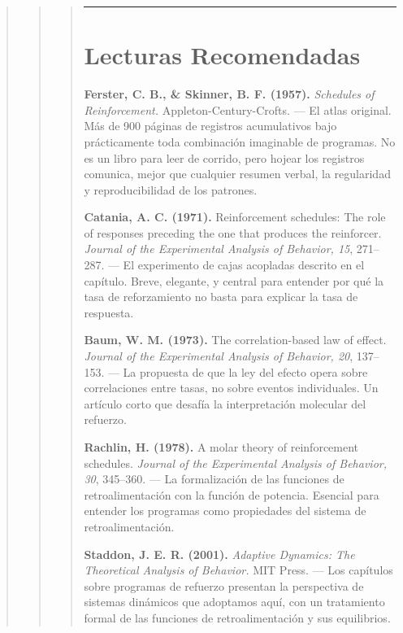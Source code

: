 \documentclass[
  letterpaper,
  DIV=11,
  numbers=noendperiod]{scrreprt}
\begin{document}
\begin{tcolorbox}[enhanced jigsaw, arc=.35mm, bottomrule=.15mm, breakable, colback=white, colframe=quarto-callout-note-color-frame, left=2mm, leftrule=.75mm, opacityback=0, rightrule=.15mm, toprule=.15mm]
\begin{quote}
\begin{quote}
\begin{quote}
\begin{center}\rule{0.5\linewidth}{0.5pt}\end{center}

\mbox{}%
\section{Lecturas Recomendadas}\label{lecturas-recomendadas-5}

\textbf{Ferster, C. B., \& Skinner, B. F. (1957).} \emph{Schedules of
Reinforcement.} Appleton-Century-Crofts. --- El atlas original. Más de
900 páginas de registros acumulativos bajo prácticamente toda
combinación imaginable de programas. No es un libro para leer de
corrido, pero hojear los registros comunica, mejor que cualquier resumen
verbal, la regularidad y reproducibilidad de los patrones.

\textbf{Catania, A. C. (1971).} Reinforcement schedules: The role of
responses preceding the one that produces the reinforcer. \emph{Journal
of the Experimental Analysis of Behavior, 15}, 271--287. --- El
experimento de cajas acopladas descrito en el capítulo. Breve, elegante,
y central para entender por qué la tasa de reforzamiento no basta para
explicar la tasa de respuesta.

\textbf{Baum, W. M. (1973).} The correlation-based law of effect.
\emph{Journal of the Experimental Analysis of Behavior, 20}, 137--153.
--- La propuesta de que la ley del efecto opera sobre correlaciones
entre tasas, no sobre eventos individuales. Un artículo corto que
desafía la interpretación molecular del refuerzo.

\textbf{Rachlin, H. (1978).} A molar theory of reinforcement schedules.
\emph{Journal of the Experimental Analysis of Behavior, 30}, 345--360.
--- La formalización de las funciones de retroalimentación con la
función de potencia. Esencial para entender los programas como
propiedades del sistema de retroalimentación.

\textbf{Staddon, J. E. R. (2001).} \emph{Adaptive Dynamics: The
Theoretical Analysis of Behavior.} MIT Press. --- Los capítulos sobre
programas de refuerzo presentan la perspectiva de sistemas dinámicos que
adoptamos aquí, con un tratamiento formal de las funciones de
retroalimentación y sus equilibrios.
\end{quote}
\end{quote}
\end{quote}

\end{tcolorbox}
\end{document}
